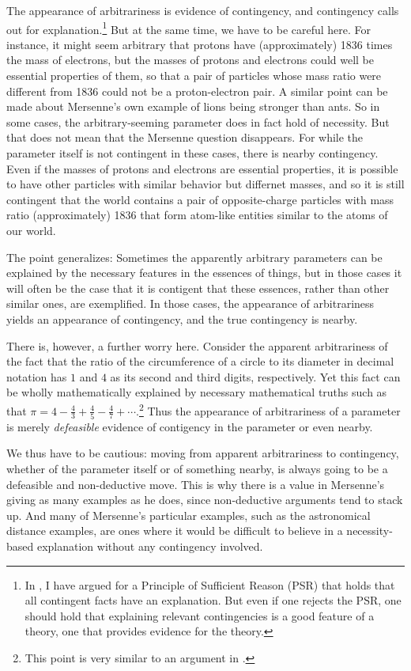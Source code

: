 The appearance of arbitrariness is evidence of contingency, and contingency calls out for explanation.\footnote{In , I have
argued for a Principle of Sufficient Reason (PSR) that holds that all contingent facts have an explanation. But even if one rejects
the PSR, one should hold that explaining relevant contingencies is a good feature of a theory, one that provides evidence for the
theory.} But at the 
same time, we have to be careful here. For instance,
it might seem arbitrary that protons have (approximately) 1836 times the mass of electrons, but the masses of protons and
electrons could well be essential properties of them, so that a pair of particles whose mass ratio were different from 1836 could 
not be a proton-electron pair. A similar point can be made about Mersenne's own example of lions being stronger
than ants.  So in some cases, the arbitrary-seeming parameter does in fact hold of necessity. But that does not
mean that the Mersenne question disappears. For while the parameter itself is not contingent in these cases, there is 
nearby contingency. Even if the masses of protons and electrons are essential properties, it is possible to have 
other particles with similar
behavior but differnet masses, and so it is still contingent that the world contains a pair of opposite-charge particles with mass ratio 
(approximately) 1836 that form atom-like entities similar to the atoms of our world. 

The point generalizes: Sometimes the apparently arbitrary parameters can be explained by the necessary features in the essences of
things, but in those cases it will often be the case that it is contigent that these essences, rather than other similar ones, are
exemplified. In those cases, the appearance of arbitrariness yields an appearance of contingency, and the true contingency is 
nearby.

There is, however, a further worry here. Consider the apparent arbitrariness of the fact that the ratio of the circumference of
a circle to its diameter in decimal notation has $1$ and $4$ as its second and third digits, respectively. Yet this fact can 
be wholly mathematically explained by necessary mathematical truths such as that $\pi=4-\frac43+\frac45-\frac47+\cdots$.\footnote{This 
point is very similar to an argument in .} Thus the appearance of arbitrariness of a parameter is merely
\textit{defeasible} evidence of contigency in the parameter or even nearby. 

We thus have to be cautious: moving from apparent arbitrariness to contingency, whether of the parameter itself or of something nearby, is
always going to be a defeasible and non-deductive move. This is why there is a value in Mersenne's giving as many examples as he does, since 
non-deductive arguments tend to stack up. And many of Mersenne's particular examples, such as the astronomical distance examples, 
are ones where it would be difficult to believe in a necessity-based explanation without any contingency involved. 

